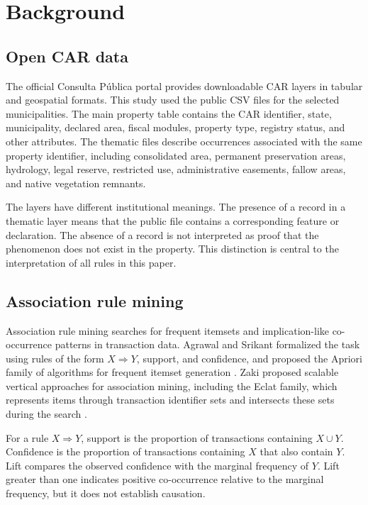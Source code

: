 \documentclass[11pt]{article}
\begin{document}
\section{Background}

\subsection{Open CAR data}

The official Consulta Pública portal provides downloadable CAR layers in tabular and geospatial formats. This study used the public CSV files for the selected municipalities. The main property table contains the CAR identifier, state, municipality, declared area, fiscal modules, property type, registry status, and other attributes. The thematic files describe occurrences associated with the same property identifier, including consolidated area, permanent preservation areas, hydrology, legal reserve, restricted use, administrative easements, fallow areas, and native vegetation remnants.

The layers have different institutional meanings. The presence of a record in a thematic layer means that the public file contains a corresponding feature or declaration. The absence of a record is not interpreted as proof that the phenomenon does not exist in the property. This distinction is central to the interpretation of all rules in this paper.

\subsection{Association rule mining}

Association rule mining searches for frequent itemsets and implication-like co-occurrence patterns in transaction data. Agrawal and Srikant formalized the task using rules of the form $X \Rightarrow Y$, support, and confidence, and proposed the Apriori family of algorithms for frequent itemset generation \citep{agrawal1994}. Zaki proposed scalable vertical approaches for association mining, including the Eclat family, which represents items through transaction identifier sets and intersects these sets during the search \citep{zaki2000}.

For a rule $X \Rightarrow Y$, support is the proportion of transactions containing $X \cup Y$. Confidence is the proportion of transactions containing $X$ that also contain $Y$. Lift compares the observed confidence with the marginal frequency of $Y$. Lift greater than one indicates positive co-occurrence relative to the marginal frequency, but it does not establish causation.
\end{document}
